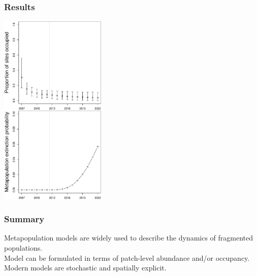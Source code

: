 \documentclass[color=usenames,dvipsnames]{beamer}\usepackage[]{graphicx}\usepackage[]{xcolor}
\begin{document}
\begin{frame}
  \frametitle{Results}
  \begin{center}
    \includegraphics[width=0.38\textwidth]{figs/proj-ext2} \\
  \end{center}
\end{frame}




\begin{frame}
  \frametitle{Summary}
  \large
  Metapopulation models are widely used to describe the
      dynamics of fragmented populations. \\
  \vfill
  Model can be formulated in terms of patch-level abundance
      and/or occupancy. \\
  \vfill
  Modern models are stochastic and spatially explicit.
\end{frame}
\end{document}
